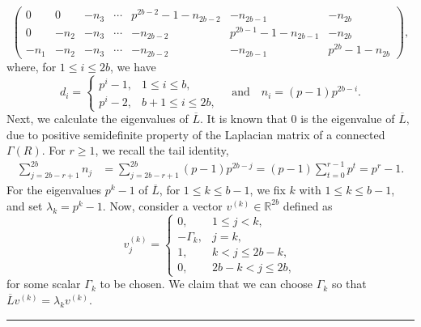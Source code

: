 \documentclass[12pt,twoside]{article}
\renewenvironment{proof}{{\noindent\bfseries Proof.}}{\qed}
\def\qed{\nolinebreak\hfill\rule{.2cm}{.2cm}\par\addvspace{.5cm}}
\begin{document}
\begin{proof}
\[\begin{pmatrix}
			0   & 0   & -n_3 & \cdots &
			p^{ 2b-2}-1-n_{2b-2} & -n_{2b-1} & -n_{2b} \\[3pt]
			0   & -n_2 & -n_3 & \cdots & -n_{2b-2} &
			p^{ 2b-1}-1-n_{2b-1} & -n_{2b} \\[3pt]
			-n_1 & -n_2 & -n_3 & \cdots & -n_{2b-2} & -n_{2b-1} &
			p^{ 2b}-1-n_{2b}
		\end{pmatrix},
		\]
		where, for \(1\le i\le 2b\), we have
		\[
		d_i =
		\begin{cases}
			p^{i}-1, & 1\le i\le b,\\[3pt]
			p^{i}-2, & b+1\le i\le 2b,
		\end{cases}
		\quad\text{and}\quad
		n_i = (p-1)p^{2b-i}.
		\]
		Next, we calculate the  eigenvalues of $\overline{L}$.	 It is known that $0$ is the eigenvalue of $\overline{L}, $ due to positive semidefinite property of the Laplacian matrix of a  connected $ \varGamma(R).$
	For $r\ge1$, we recall the tail identity,
	\begin{align}
		\sum_{j=2b-r+1}^{2b} n_j
		&= \sum_{j=2b-r+1}^{2b} (p-1)p^{2b-j}
		= (p-1)\sum_{t=0}^{r-1} p^{t}
		= p^{r}-1. \label{eq:tail-sum}
	\end{align}
	For the eigenvalues $p^{k}-1$ of $\overline{L}$, for $1\le k\le b-1$, we fix $k$ with $1\le k\le b-1$, and set
	$	\lambda_k = p^{k}-1.$ Now, consider a  vector $v^{(k)}\in\mathbb{R}^{2b}$ defined as
	\begin{equation}\label{eq:v-k-def}
		v^{(k)}_j =
		\begin{cases}
			0, & 1\le j<k,\\
			- \varGamma_k, & j=k,\\
			1, & k<j\le 2b-k,\\
			0, & 2b-k<j\le 2b,
		\end{cases}
	\end{equation}
	for some scalar $ \varGamma_k$ to be chosen.	We claim that we can choose $ \varGamma_k$ so that $\overline{L} v^{(k)} = \lambda_k v^{(k)}.$
	

\end{proof}
\end{document}

